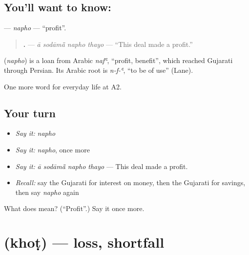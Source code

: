 \subsection*{You'll want to know: }
\textbf{} — \emph{napho} — \textquotedblleft{}profit\textquotedblright{}.

\begin{quote}
\textbf{   .} — \emph{ā sodāmā̃ napho thayo} — \textquotedblleft{}This deal made a profit.\textquotedblright{}
\end{quote}

\begin{cousinweb}
\textbf{} (\emph{napho}) is a loan from Arabic \emph{nafʿ}, \textquotedblleft{}profit, benefit\textquotedblright{}, which reached Gujarati through Persian. Its Arabic root is \emph{n-f-ʿ}, \textquotedblleft{}to be of use\textquotedblright{} (Lane).
\end{cousinweb}

\begin{grammarlens}[title={What you've built}]
One more word for everyday life at A2.
\end{grammarlens}

\subsection*{Your turn}
\begin{itemize}
\raggedright
  \item \emph{Say it:} \emph{napho}
  \item \emph{Say it:} \emph{napho}, once more
  \item \emph{Say it:} \emph{ā sodāmā̃ napho thayo} — This deal made a profit.
  \item \emph{Recall:} say the Gujarati for interest on money, then the Gujarati for savings, then say \emph{napho} again
\end{itemize}

\begin{tcolorbox}[breakable,colback=teal!4,colframe=teal!35!black,title={Before you move on}]
What does  mean? (\textquotedblleft{}Profit\textquotedblright{}.) Say it once more.
\end{tcolorbox}
\section[\texorpdfstring{\gu{ખોટ} (khoṭ)}{ખોટ (khoṭ)}]{ (khoṭ) — loss, shortfall}


